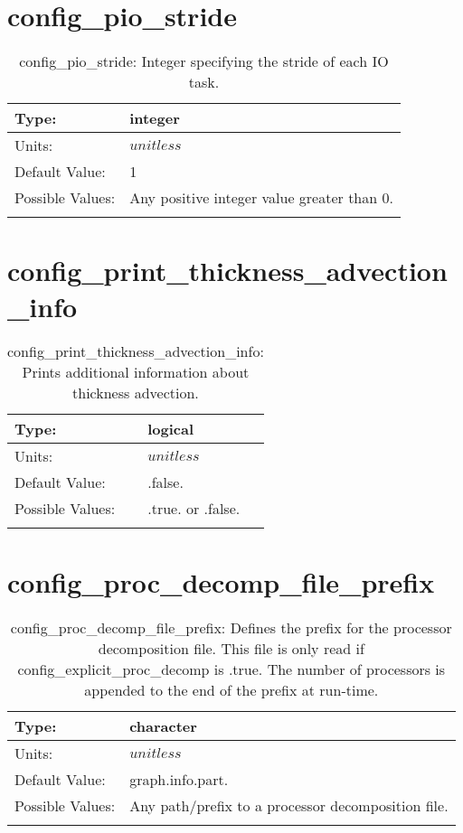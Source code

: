 \section[config\_pio\_stride]{config\_pio\_stride}
\label{sec:nm_sec_config_pio_stride}
\begin{center}
\begin{longtable}{| p{2.0in} || p{4.0in} |}
    \hline
    Type: & integer \\
    \hline
    Units: & $unitless$ \\
    \hline
    Default Value: & 1 \\
    \hline
    Possible Values: & Any positive integer value greater than 0. \\
    \hline
    \caption{config\_pio\_stride: Integer specifying the stride of each IO task.}
\end{longtable}
\end{center}
\section[config\_print\_thickness\_advection\_info]{config\_print\_thickness\_advection\_info}
\label{sec:nm_sec_config_print_thickness_advection_info}
\begin{center}
\begin{longtable}{| p{2.0in} || p{4.0in} |}
    \hline
    Type: & logical \\
    \hline
    Units: & $unitless$ \\
    \hline
    Default Value: & .false. \\
    \hline
    Possible Values: & .true. or .false. \\
    \hline
    \caption{config\_print\_thickness\_advection\_info: Prints additional information about thickness advection.}
\end{longtable}
\end{center}
\section[config\_proc\_decomp\_file\_prefix]{config\_proc\_decomp\_file\_prefix}
\label{sec:nm_sec_config_proc_decomp_file_prefix}
\begin{center}
\begin{longtable}{| p{2.0in} || p{4.0in} |}
    \hline
    Type: & character \\
    \hline
    Units: & $unitless$ \\
    \hline
    Default Value: & graph.info.part. \\
    \hline
    Possible Values: & Any path/prefix to a processor decomposition file. \\
    \hline
    \caption{config\_proc\_decomp\_file\_prefix: Defines the prefix for the processor decomposition file. This file is only read if config\_explicit\_proc\_decomp is .true. The number of processors is appended to the end of the prefix at run-time.}
\end{longtable}
\end{center}
